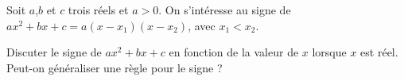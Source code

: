 %
%
	Soit $a$,$b$ et $c$ trois réels et $a>0$. On s'intéresse au signe de $ax^2+bx + c=a(x-x_1)(x-x_2)$, avec $x_1<x_2$.
	\begin{tasks}
		\task Discuter le signe de $ax^2+bx + c$ en fonction de la valeur de  $x$ lorsque $x$ est réel.
		\task Peut-on généraliser une règle pour le signe ?
	\end{tasks}
